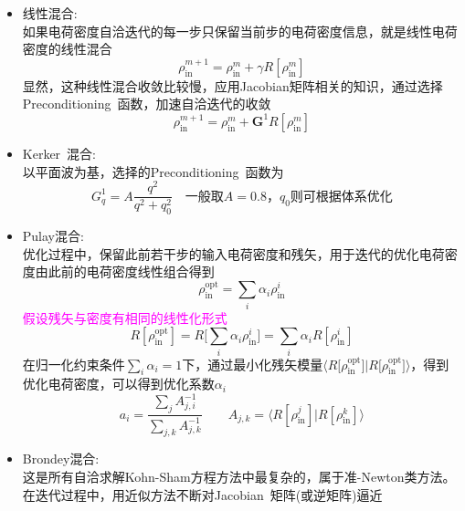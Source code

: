 {	\begin{itemize}
		\item 线性混合:\\
			如果电荷密度自洽迭代的每一步只保留当前步的电荷密度信息，就是线性电荷密度的线性混合
			\begin{displaymath}
				\rho_{\mathrm{in}}^{m+1}=\rho_{\mathrm{in}}^{m}+\gamma R[\rho_{\mathrm{in}}^m]
			\end{displaymath}
	显然，这种线性混合收敛比较慢，应用\textrm{Jacobian}矩阵相关的知识，通过选择\textrm{Preconditioning~}函数，加速自洽迭代的收敛
	\begin{displaymath}
		\rho_{\mathrm{in}}^{m+1}=\rho_{\mathrm{in}}^{m}+\mathbf{G}^1R[\rho_{\mathrm{in}}^m]
	\end{displaymath}
		\item \textrm{Kerker~}混合:\\%
			以平面波为基，选择的\textrm{Preconditioning~}函数为
			\begin{displaymath}
				G_q^1=A\dfrac{q^2}{q^2+q_0^2}\quad\mbox{一般取$A=0.8$，$q_0$则可根据体系优化}
			\end{displaymath}
		\item \textrm{Pulay}混合:\\
			优化过程中，保留此前若干步的输入电荷密度和残矢，用于迭代的优化电荷密度由此前的电荷密度线性组合得到
			\begin{displaymath}
				\rho_{\mathrm{in}}^{\mathrm{opt}}=\sum_i\alpha_i\rho_{\mathrm{in}}^i
			\end{displaymath}
			\textcolor{magenta}{假设残矢与密度有相同的线性化形式}
			\begin{displaymath}
				R[\rho_{\mathrm{in}}^{\mathrm{opt}}]=R\bigg[\sum_i\alpha_i\rho_{\mathrm{in}}^i\bigg]=\sum_i\alpha_iR[\rho_{\mathrm{in}}^i]
			\end{displaymath}
			在归一化约束条件$\sum\limits_{i}\alpha_i=1$下，通过最小化残矢模量$\langle R\big[\rho_{\mathrm{in}}^{\mathrm{opt}}\big]|R\big[\rho_{\mathrm{in}}^{\mathrm{opt}}\big]\rangle$，得到优化电荷密度，可以得到优化系数$\alpha_i$
	\begin{displaymath}
		a_i=\dfrac{\sum\limits_{j}A_{j,i}^{-1}}{\sum\limits_{j,k}A_{j,k}^{-1}}\qquad A_{j,k}=\langle R[\rho_{\mathrm{in}}^{j}]|R[\rho_{\mathrm{in}}^{k}]\rangle 
	\end{displaymath}
\item \textrm{Brondey}混合:\\
	这是所有自洽求解\textrm{Kohn-Sham}方程方法中最复杂的，属于准-\textrm{Newton}类方法。在迭代过程中，用近似方法不断对\textrm{Jacobian~}矩阵(或逆矩阵)逼近\\

\end{itemize}}
